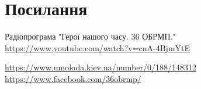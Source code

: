  
 
\chapter{Посилання}

Радіопрограма "Герої нашого часу. 36 ОБРМП."
\url{https://www.youtube.com/watch?v=cnA-4BjmYtE}

\url{https://www.umoloda.kiev.ua/number/0/188/148312}
\url{https://www.facebook.com/36obrmp/}
  
